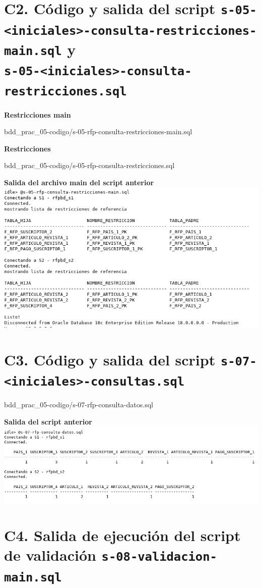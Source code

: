\documentclass{article}
\begin{document}
\section*{C2. Código y salida del script 
\texttt{s-05-<iniciales>-consulta-restricciones-main.sql} y\\
\texttt{s-05-<iniciales>-consulta-restricciones.sql}}

\textbf{Restricciones main}


{bdd_prac_05-codigo/s-05-rfp-consulta-restricciones-main.sql}

\textbf{Restricciones}


{bdd_prac_05-codigo/s-05-rfp-consulta-restricciones.sql}

\textbf{Salida del archivo main del script anterior}\\
\includegraphics[width=0.8\linewidth]{bdd_prac05-c2-restricciones}

\section*{C3. Código y salida del script 
\texttt{s-07-<iniciales>-consultas.sql}}


{bdd_prac_05-codigo/s-07-rfp-consulta-datos.sql}

\newpage
\textbf{Salida del script anterior}\\
\includegraphics[width=\linewidth]{bdd_prac05-c3-consulta-datos}

\section*{C4. Salida de ejecución del script de validación 
\texttt{s-08-validacion-main.sql}}            
\end{document}
